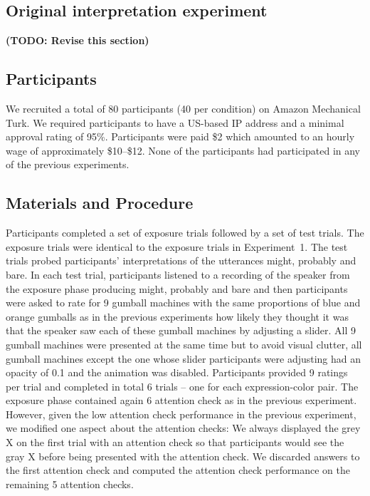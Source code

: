 \documentclass[man, floatsintext]{apa6}
\newcommand{\todo}[1]{}
\renewcommand{\todo}[1]{{\bf \color{red} (TODO: {#1})}}
\begin{document}
\subsection*{Original interpretation experiment}

\todo{Revise this section}

\subsection{Participants}

We recruited a total of 80 participants (40 per condition) on Amazon Mechanical Turk. We required participants to have a US-based IP address and a minimal approval rating of 95\%. Participants were paid \$2 which amounted to an hourly wage of approximately \$10--\$12. None of the participants had participated in any of the previous experiments. 

\subsection{Materials and Procedure}

Participants completed a set of exposure trials followed by a set of test trials. The exposure trials were identical to the exposure trials in Experiment~1. The test trials probed participants' interpretations of the utterances {\sc might}, {\sc probably} and {\sc bare}. In each test trial, participants listened to a recording of the speaker from the exposure phase producing {\sc might}, {\sc probably} and {\sc bare} and then participants were asked to rate for 9 gumball machines with the same proportions of blue and orange gumballs as in the previous experiments how likely they thought it was that the speaker saw each of these gumball machines by adjusting a slider. All 9 gumball machines were presented at the same time but to avoid visual clutter, all gumball machines except the one whose slider participants were adjusting had an opacity of 0.1 and the animation was disabled. Participants provided 9 ratings per trial and completed in total 6 trials -- one for each expression-color pair. The exposure phase contained again 6 attention check as in the previous experiment. However, given the low attention check performance in the previous experiment, we modified one aspect about the attention checks: We always displayed the grey X on the first trial with an attention check so that participants would see the gray X before being presented with the attention check. We discarded answers to the first attention check and computed the attention check performance on the remaining 5 attention checks.
\end{document}
